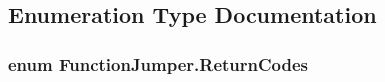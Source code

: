 \subsection{Enumeration Type Documentation}
\subsubsection[{\texorpdfstring{Return\+Codes}{ReturnCodes}}]{\setlength{\rightskip}{0pt plus 5cm}enum {\bf Function\+Jumper.\+Return\+Codes}\hspace{0.3cm}{\ttfamily [strong]}}\hypertarget{namespace_function_jumper_a24f4a41f38d23a485ba532d6171b2048_a24f4a41f38d23a485ba532d6171b2048}{}\label{namespace_function_jumper_a24f4a41f38d23a485ba532d6171b2048_a24f4a41f38d23a485ba532d6171b2048}
